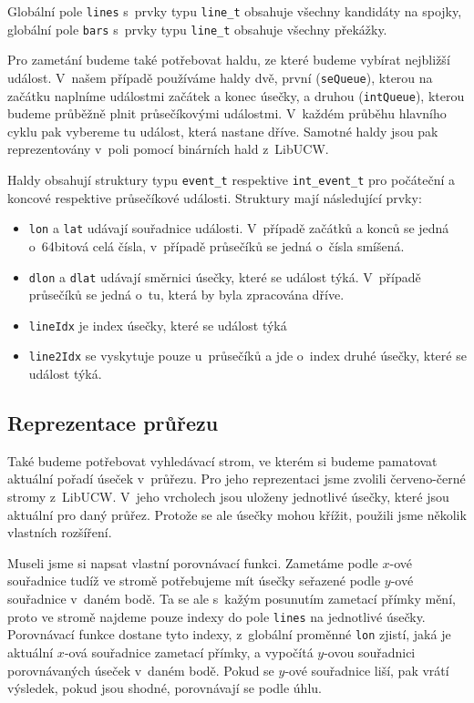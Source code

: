 Globální pole \verb|lines| s~prvky typu \verb|line_t| obsahuje všechny kandidáty
na spojky, globální pole \verb|bars| s~prvky typu \verb|line_t| obsahuje všechny
překážky. 

Pro zametání budeme také potřebovat haldu, ze které budeme vybírat nejbližší
událost. V~našem případě používáme haldy dvě, první (\verb|seQueue|), kterou na
začátku naplníme událostmi začátek a konec úsečky, a druhou (\verb|intQueue|),
kterou budeme průběžně plnit průsečíkovými událostmi. V~každém průběhu hlavního
cyklu pak vybereme tu událost, která nastane dříve. Samotné haldy jsou pak
reprezentovány v~poli pomocí binárních hald z~LibUCW. 

Haldy obsahují struktury typu \verb|event_t| respektive \verb|int_event_t| pro
počáteční a koncové respektive průsečíkové události. Struktury mají následující
prvky:
\begin{itemize}
	\item \verb|lon| a \verb|lat| udávají souřadnice události. V~případě
	začátků a konců se jedná o~64bitová celá čísla, v~případě průsečíků se
	jedná o~čísla smíšená. 
	\item \verb|dlon| a \verb|dlat| udávají směrnici úsečky, které se
	událost týká. V~případě průsečíků se jedná o~tu, která by byla
	zpracována dříve.
	\item \verb|lineIdx| je index úsečky, které se událost týká
	\item \verb|line2Idx| se vyskytuje pouze u~průsečíků a jde o~index druhé
	úsečky, které se událost týká.
\end{itemize}


\subsection{Reprezentace průřezu}
Také budeme potřebovat vyhledávací strom, ve kterém si budeme pamatovat aktuální
pořadí úseček v~průřezu. Pro jeho reprezentaci jsme zvolili červeno-černé stromy
z~LibUCW. V~jeho vrcholech jsou uloženy jednotlivé úsečky, které jsou aktuální
pro daný průřez. Protože se ale úsečky mohou křížit, použili jsme několik
vlastních rozšíření. 

Museli jsme si napsat vlastní {\tuc porovnávací funkci}. Zametáme podle $x$-ové
souřadnice tudíž ve stromě potřebujeme mít úsečky seřazené podle $y$-ové
souřadnice v~daném bodě. Ta se ale s~kažým posunutím zametací přímky mění,
proto ve stromě najdeme pouze indexy do pole \verb|lines| na jednotlivé úsečky.
Porovnávací funkce dostane tyto indexy, z~globální proměnné \verb|lon| zjistí,
jaká je aktuální $x$-ová souřadnice zametací přímky, a vypočítá $y$-ovou
souřadnici porovnávaných úseček v~daném bodě. Pokud se $y$-ové souřadnice liší,
pak vrátí výsledek, pokud jsou shodné, porovnávají se podle úhlu. 

